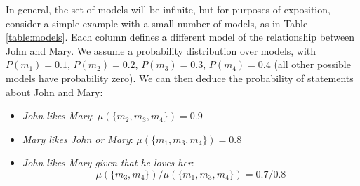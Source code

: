 \documentclass[manuscript]{clv2}
\begin{document}
In general, the set of models will be infinite, but for purposes of 
exposition, consider a simple example with a small 
number of models, as in Table
\ref{table:models}. Each column defines a
different model of the relationship between John and Mary.  We
assume a probability distribution over models, with $P(m_1)
= 0.1$, $P(m_2) = 0.2$, $P(m_3) = 0.3$, $P(m_4) = 0.4$ (all other
possible models have probability zero). We can then
deduce the probability of statements about John and Mary:
\begin{itemize}
\item \emph{John likes Mary}: $\mu(\{m_2, m_3, m_4\}) = 0.9$
\item \emph{Mary likes John or Mary}: $\mu(\{m_1, m_3, m_4\}) = 0.8$
\item \emph{John likes Mary given that he loves her}: $$\mu(\{m_3, m_4\})/\mu(\{m_1, m_3, m_4\}) = 0.7/0.8$$
\end{itemize}





\end{document}

